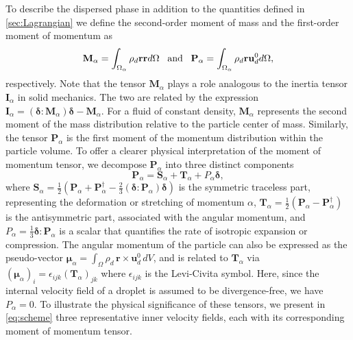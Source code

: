 To describe the dispersed phase in addition to the quantities defined in \ref{sec:Lagrangian} we define the second-order moment of mass and the first-order moment of momentum as 
\begin{equation}
    \textbf{M}_\alpha 
    = \intO{ \rho_d \textbf{r} \textbf{r} }
    \;\;\;\text{and}\;\;\;
    \textbf{P}_\alpha 
    = \intO{ \rho_d \textbf{r} \textbf{u}_d^0 },
    \label{eq:first_moment_of_momentum_def}
\end{equation}
respectively. 
Note that the tensor $\textbf{M}_\alpha$ plays a role analogous to the inertia tensor $\textbf{I}_\alpha$ in solid mechanics. 
The two are related by the expression  $\textbf{I}_\alpha = (\bm\delta : \textbf{M}_\alpha)\bm\delta - \textbf{M}_\alpha$.
For a fluid of constant density, $\textbf{M}_\alpha$ represents the second moment of the mass distribution relative to the particle center of mass.
Similarly, the tensor $\textbf{P}_\alpha$ is the first moment of the momentum distribution within the particle volume. 
To offer a clearer physical interpretation of the moment of momentum tensor, we decompose $\textbf{P}_\alpha$ into three distinct components  
\begin{equation}
\textbf{P}_\alpha = \textbf{S}_\alpha + \textbf{T}_\alpha + P_\alpha \bm\delta,
\end{equation}
where $\textbf{S}_\alpha = \frac{1}{2}\left(\textbf{P}_\alpha + \textbf{P}_\alpha^\dagger - \frac{2}{3}(\bm\delta:\textbf{P}_\alpha)\bm\delta\right)$ is the symmetric traceless part, representing the  deformation or stretching of momentum $\alpha$,
$\textbf{T}_\alpha = \frac{1}{2}(\textbf{P}_\alpha - \textbf{P}_\alpha^\dagger)$ is the antisymmetric part, associated with the angular momentum,
and $P_\alpha = \frac{1}{3} \bm\delta : \textbf{P}_\alpha$ is a scalar that quantifies the rate of isotropic expansion or compression. 
The angular momentum of the particle can also be expressed as the pseudo-vector  
$\bm\mu_\alpha = \int_\Omega \rho_d\, \textbf{r} \times \textbf{u}_d^0 \, dV$,
and is related to $\textbf{T}_\alpha$ via $(\bm\mu_\alpha)_i = \epsilon_{ijk} (\textbf{T}_\alpha)_{jk}$ %
where $\epsilon_{ijk}$ is the Levi-Civita symbol.
Here, since the internal velocity field of a droplet is assumed to be divergence-free, we have $P_\alpha = 0$. 
To illustrate the physical significance of these tensors, we present in \ref{eq:scheme} three representative inner velocity fields, each with its corresponding moment of momentum tensor.
